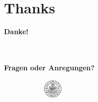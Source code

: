 
\section{Thanks}
\begin{frame}
    
    \centering
    \vspace{2cm}
    
    \textbf{\Huge Danke!}
 
    \ \\
    \ \\
    \textbf{Fragen oder Anregungen?}
    
    
    \vspace{1.5cm}
    \begin{figure}
        \centering
        \begin{subfigure}{0.2\textwidth}
            \centering
            \includegraphics[height=1cm]{assets/img/uhh-gray.png}
        \end{subfigure}%
    \end{figure}
\end{frame}